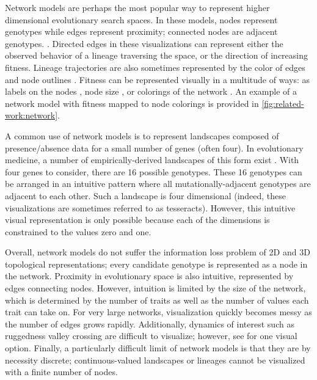 Network models are perhaps the most popular way to represent higher dimensional evolutionary search spaces.
In these models, nodes represent genotypes while edges represent proximity; connected nodes are adjacent genotypes. \citep{mccandlish_visualizing_2011}.
Directed edges in these visualizations can represent either the observed behavior of a lineage traversing the space, or the direction of increasing fitness.
Lineage trajectories are also sometimes represented by the color of edges and node outlines \citep{ogbunugafor_competition_2017}.
Fitness can be represented visually in a multitude of ways: as labels on the nodes \citep{ogbunugafor_competition_2017}, node size \citep{mccandlish_visualizing_2011, iram_controlling_2021}, or colorings of the network \citep{wu_adaptation_2016, jimenez_comprehensive_2013}. 
An example of a network model with fitness mapped to node colorings is provided in \autoref{fig:related-work:network}.

A common use of network models is to represent landscapes composed of presence/absence data for a small number of genes (often four). In evolutionary medicine, a number of empirically-derived landscapes of this form exist \citep{mira_rational_2015, ogbunugafor_adaptive_2016}. With four genes to consider, there are 16 possible genotypes. These 16 genotypes can be arranged in an intuitive pattern where all mutationally-adjacent genotypes are adjacent to each other. Such a landscape is four dimensional (indeed, these visualizations are sometimes referred to as tesseracts). However, this intuitive visual representation is only possible because each of the dimensions is constrained to the values zero and one. %

Overall, network models do not suffer the information loss problem of 2D and 3D topological representations; every candidate genotype is represented as a node in the network. 
Proximity in evolutionary space is also intuitive, represented by edges connecting nodes. 
However, intuition is limited by the size of the network, which is determined by the number of traits as well as the number of values each trait can take on.
For very large networks, visualization quickly becomes messy as the number of edges grows rapidly.  
Additionally, dynamics of interest such as ruggedness valley crossing are difficult to visualize; however, see \citep{ogbunugafor_competition_2017} for one visual option.
Finally, a particularly difficult limit of network models is that they are by necessity discrete; continuous-valued landscapes or lineages cannot be visualized with a finite number of nodes.

